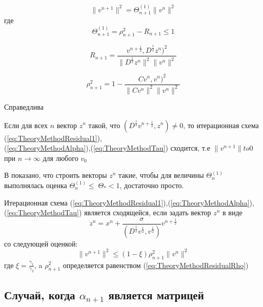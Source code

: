 \begin{equation}
    \label{eq:TheoryMethodResidualSimple}
    \|v^{n+1}\|^2=\Theta^{(1)}_{n+1}\|v^n\|^2
\end{equation}
где
\begin{equation}
    \label{eq:TheoryMethodResidualLessOne}
    \Theta^{(1)}_{n+1}=\rho^2_{n+1}-R_{n+1}\leq1
\end{equation}

\begin{equation}
    \label{eq:TheoryMethodResidualR}
    R_{n+1}=\frac{v^{n+\frac{1}{2}},D^{\frac{1}{2}}z^n)^2}{\|D^{\frac{1}{2}}z^n\|^2\|v^n\|^2}
\end{equation}

\begin{equation}
    \label{eq:TheoryMethodResidualRho}
    \rho^2_{n+1}=1-\frac{Cv^n,v^n)^2}{\|Cv^n\|^2\|v^n\|^2}
\end{equation}

Справедлива
\begin{Theorem}
    Если для всех $n$ вектор $z^n$ такой, что $(D^{\frac{1}{2}}v^{n+\frac{1}{2}},z^n)\neq 0$, то итерационная схема (\ref{eq:TheoryMethodResidual1}),\\(\ref{eq:TheoryMethodAlpha}),(\ref{eq:TheoryMethodTau}) сходится, т.е $\|v^{n+1}\|to 0$ при $n\to \infty$ для любого $v_0$
\end{Theorem}

В \cite{zakharov} показано, что строить векторы $z^n$ такие, чтобы для величины $\Theta^{(1)}_{n}$ выполнялась оценка $\Theta^{(1)}_{n}\leq\;\Theta_{*}<1$, достаточно просто.

\begin{Theorem}
    Итерационная схема (\ref{eq:TheoryMethodResidual1}),(\ref{eq:TheoryMethodAlpha}),(\ref{eq:TheoryMethodTau}) является сходящейся, если задать вектор $z^n$ в виде
    \begin{equation*}
	z^n=x^n+\frac{\sigma}{(D^{\frac{1}{2}}v^{\frac{1}{2}},v^{\frac{1}{2}})}v^{n+\frac{1}{2}}
    \end{equation*}
    со следующей оценкой:
    \begin{equation}
	\|v^{n+1}\|^2\leq(1-\xi)\rho^2_{n+1}\|v^n\|^2
    \end{equation}
    где $\xi = \frac{\gamma_1}{\gamma_2}$, a $\rho^2_{n+1}$ определяется равенством (\ref{eq:TheoryMethodResidualRho})
\end{Theorem}

\addtocounter{subsection}{1}
\subsection*{Случай, когда $\alpha_{n+1}$ является матрицей}

